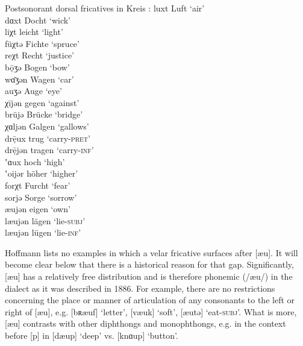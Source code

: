 \ea%
\label{ex:7:13}Postsonorant dorsal fricatives in Kreis :
\ea\label{ex:7:13a} luxt \tab [lʊxt] \tab Luft \tab ‘air’ \\
dɑxt \tab [dɑxt] \tab Docht \tab ‘wick’ \\
\ex\label{ex:7:13b}  liχt \tab [lɪçt] \tab  leicht \tab ‘light’ \\
füχtə \tab [fʏçtə] \tab  Fichte \tab ‘spruce’ \\
reχt \tab [ʀɛçt] \tab  Recht \tab ‘justice’ \\
\ex\label{ex:7:13c}   bọ̄ʒə \tab [boːɣən] \tab Bogen \tab ‘bow’ \\
wɑ̄ʒən \tab [vɑːɣən] \tab Wagen \tab ‘car’ \\
auʒə \tab [ɑuɣə] \tab Auge \tab ‘eye’ \\
\ex\label{ex:7:13d}   χījən \tab [çiːʝǝn] \tab gegen \tab ‘against’ \\
brüjə \tab [brʏʝə] \tab Brücke \tab ‘bridge’ \\
\ex\label{ex:7:13e}  χɑljən \tab [çɑlʝən] \tab Galgen \tab ‘gallows’ \\
\ex\label{ex:7:13f}  drẹ̄ux \tab [dreːux] \tab trug \tab ‘carry\textsc{{}-pret}’ \\
drẹ̄jən \tab [dreːʝən] \tab tragen \tab ‘carry\textsc{{}-inf}’ \\
ʽɑux \tab [hɑux] \tab hoch \tab ‘high’ \\
ʽoijər \tab [hoiʝər] \tab höher \tab ‘higher’ \\
\ex\label{ex:7:13g}  forχt \tab [fɔʀçt] \tab  Furcht \tab ‘fear’ \\
sorjə \tab [sɔʀʝə] \tab Sorge \tab ‘sorrow’ \\
\ex\label{ex:7:13h}  æujən \tab  [æuʝən] \tab  eigen \tab ‘own’ \\
læujən \tab  [læuʝən] \tab lägen \tab ‘lie\textsc{{}-subj}’ \\
læujən \tab  [læuʝən] \tab lügen \tab ‘lie\textsc{{}-inf}’ 
\z 
\z 


Hoffmann lists no examples in which a velar fricative surfaces after [æu]. It will become clear below that there is a historical reason for that gap. Significantly, [æu] has a relatively free distribution and is therefore phonemic (/æu/) in the dialect as it was described in 1886. For example, there are no restrictions concerning the place or manner of articulation of any consonants to the left or right of [æu], e.g. [bʀæuf] ‘letter’, [væuk] ‘soft’, [æutə] ‘eat\textsc{{}-subj}’. What is more, [æu] contrasts with other diphthongs and monophthongs, e.g. in the context before [p] in [dæup] ‘deep’ vs. [knɑup] ‘button’.

